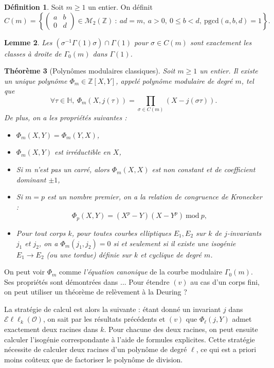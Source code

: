 \documentclass[11pt,a4paper]{article}
\newcommand{\Z}{\mathbb{Z}}
\renewcommand{\H}{\mathbb{H}}
\newcommand{\M}{\mathcal{M}}
\renewcommand{\O}{\mathcal{O}}
\newcommand{\vers}{\rightarrow}
\newcommand{\Ell}{\mathcal{E}\ell\ell}
\newtheorem{thm}{Théorème}[subsection]
\newtheorem{lem}[thm]{Lemme}
\theoremstyle{definition}
\newtheorem{defi}[thm]{Définition}
\begin{document}
\begin{defi}
Soit $m\geq 1$ un entier. On définit
$$C(m)=\left\{ 
\left(
\begin{matrix}
a & b \\
0 & d 
\end{matrix}
\right)
\in \M_2(\Z)\ :\ ad=m,\ a>0,\ 0\leq b<d,\ \mathrm{pgcd}(a,b,d)=1\right\}.$$
\end{defi}

\begin{lem}
Les $(\sigma^{-1}\Gamma(1)\sigma)\cap \Gamma(1)$ pour $\sigma\in C(m)$ sont exactement les classes à droite de $\Gamma_0(m)$ dans $\Gamma(1)$.
\end{lem}

\begin{thm}[Polynômes modulaires classiques]

Soit $m\geq 1$ un entier. Il existe un unique  polynôme $\Phi_m \in \Z[X,Y]$, appelé \emph{polynôme modulaire} de degré $m$, tel que
$$\forall \tau\in\H,\ \Phi_m(X,j(\tau))=\prod_{\sigma\in C(m)} (X-j(\sigma\tau)).$$
De plus, on a les propriétés suivantes :

\begin{itemize}
\item[(i)] $\Phi_m(X,Y)=\Phi_m(Y,X)$,
\item[(ii)] $\Phi_m(X,Y)$ est irréductible en $X$,
\item[(iii)] Si $m$ n'est pas un carré, alors $\Phi_m(X,X)$ est non constant et de coefficient dominant $\pm 1$,
\item[(iv)] Si $m=p$ est un nombre premier, on a la \emph{relation de congruence de Kronecker} :
$$\Phi_p(X,Y) = (X^p-Y)(X-Y^p) \: \mathrm{mod}\ p,$$
\item[(v)] Pour tout corps $k$, pour toutes courbes elliptiques $E_1,E_2$ sur $k$ de $j$-invariants $j_1$ et $j_2$, on a $\Phi_m(j_1,j_2)=0$ si et seulement si il existe une isogénie $E_1 \vers E_2$ (ou une tordue) définie sur $k$ et cyclique de degré $m$.
\end{itemize}

\end{thm}

On peut voir $\Phi_m$ comme \emph{l'équation canonique} de la courbe modulaire $\Gamma_0(m)$. Ses propriétés sont démontrées dans ... Pour étendre $(v)$ au cas d'un corps fini, on peut utiliser un théorème de relèvement à la Deuring ?

\vspace{5mm}

La stratégie de calcul est alors la suivante : étant donné un invariant $j$ dans $\Ell_k(\O)$, on sait par les résultats précédents et $(v)$ que $\Phi_\ell(j,Y)$ admet exactement deux racines dans $k$. Pour chacune des deux racines, on peut ensuite calculer l'isogénie correspondante à l'aide de formules explicites. Cette stratégie nécessite de calculer deux racines d'un polynôme de degré $\ell$, ce qui est a priori moins coûteux que de factoriser le polynôme de division.
\end{document}
